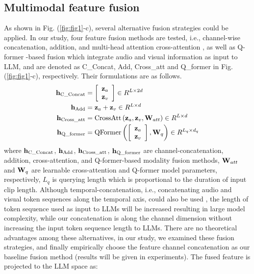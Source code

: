 \documentclass[conference]{IEEEtran}
\begin{document}
\subsection{Multimodal feature fusion}
As shown in Fig. (\ref{fig:fig1}-c), several alternative fusion strategies could be applied. In our study, four feature fusion methods are tested, i.e., channel-wise concatenation, addition, and multi-head attention cross-attention \cite{CMAlign2023}, as well as Q-former \cite{QFormer}-based fusion which integrate audio and visual information as input to LLM, and are denoted as C\_Concat, Add, Cross\_att and Q\_former in Fig. (\ref{fig:fig1}-c), respectively. Their formulations are as follows.
\begin{equation}
	\begin{array}{l}
		\begin{aligned}
			{\bf h}_{\rm{{C}\_Concat}}  &= \left[ \begin{array}{l}
				{\bf z}_a  \\ 
				{\bf z}_v  \\ 
			\end{array} \right] \in R^{L \times 2d}  \\ 
			{\bf h}_{\rm{Add}}  &= {\bf z}_a  + {\bf z}_v  \in R^{L \times d}  \\ 
			{\bf h}_{\rm{{Cross}\_att}}  &= {\rm CrossAtt}\left( {{\bf z}_a ,{\bf z}_v, {\bf W}_{att} } \right) \in R^{L \times d}  \\ 
			{\bf h}_{\rm{{Q}\_former}}  &= {\rm QFormer}\left( {\left[ \begin{array}{l}
					{\bf z}_a  \\ 
					{\bf z}_v  \\ 
				\end{array} \right] ,{\bf W}_q } \right) \in R^{L_q  \times d_q }  \\ 
		\end{aligned}
	\end{array}			
	\label{eq:fusion}
\end{equation}
where ${\bf h}_{\rm{{C}\_Concat}}$, ${\bf h}_{\rm{Add}}$, ${\bf h}_{\rm{{Cross}\_att}}$, ${\bf h}_{\rm{{Q}\_former}}$ are channel-concatenation, addition, cross-attention, and Q-former-based modality fusion methods, ${\bf W}_{att} $ and ${\bf W}_q $ are learnable cross-attention and Q-former model parameters, respectively, $L_q$ is querying length which is proportional to the duration of input clip length. Although temporal-concatenation, i.e., concatenating audio and visual token sequences along the temporal axis, could also be used \cite{CappellazzoICASSP2025}, the length of token sequence used as input to LLMs will be increased resulting in large model complexity, while our concatenation is along the channel dimension without increasing the input token sequence length to LLMs. There are no theoretical advantages among these alternatives, in our study, we examined these fusion strategies, and finally empirically choose the feature channel concatenation as our baseline fusion method (results will be given in experiments). The fused feature is projected to the LLM space as:
\end{document}
